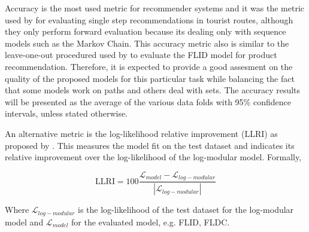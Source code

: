 Accuracy is the most used metric for recommender systems \citep{Herlocker2004} and it was the metric used by \citet{Kurashima2010} for evaluating single step recommendations in tourist routes, although they only perform forward evaluation because its dealing only with sequence models such as the Markov Chain. This accuracy metric also is similar to the leave-one-out procedured used by \citet{tschiatschek16learning} to evaluate the FLID model for product recommendation. Therefore, it is expected to provide a good assesment on the quality of the proposed models for this particular task while balancing the fact that some models work on paths and others deal with sets. The accuracy results will be presented as the average of the various data folds with 95\% confidence intervals, unless stated otherwise.

An alternative metric is the log-likelihood relative improvement (LLRI) as proposed by \citet{tschiatschek16learning}. This measures the model fit on the test dataset and indicates its relative improvement over the log-likelihood of the log-modular model. Formally,

\begin{equation}
  \mathrm{LLRI} = 100\frac{\mathcal{L}_{model} - \mathcal{L}_{log-modular}}{|\mathcal{L}_{log-modular}|}
\end{equation}

Where $\mathcal{L}_{log-modular}$ is the log-likelihood of the test dataset for the log-modular model and  $\mathcal{L}_{model}$ for the evaluated model, e.g. FLID, FLDC.